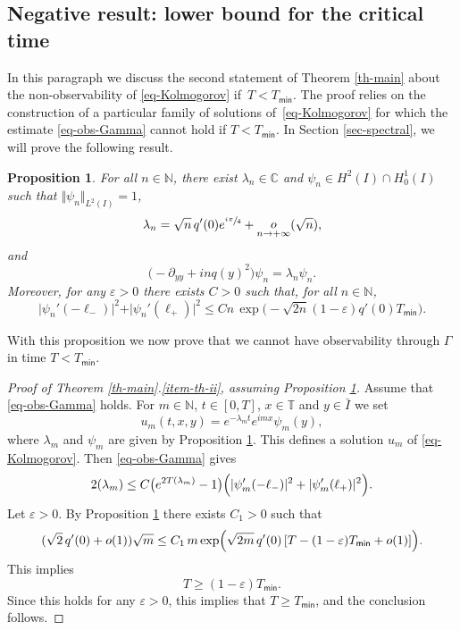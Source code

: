 \documentclass[JEP,XML,SOM,Unicode]{cedram}
\theoremstyle{plain}
\newtheorem{proposition}[theorem]{Proposition}
\theoremstyle{definition}
\newcommand{\abs}[1]{\vert #1\vert}
\newcommand{\littleo}[2]{\mathop{o}\limits_{#1 \to #2}}
\newcommand{\1}{\mathds 1}
\let\Re\relax
\DeclareMathOperator{\Re}{\mathsf{Re}\mkern2mu}
\def\C{\mathbb{C}}
\newcommand{\N}{\mathbb{N}}
\newcommand{\T}{\mathbb{T}}
\let\G\Gamma
\let\e\varepsilon
\let\l\lambda
\newcommand{\Tmin}{T_{\mathsf{min}}}
\begin{document}
\subsection{Negative result: lower bound for the critical time}

In this paragraph we discuss the second statement of Theorem \ref{th-main} about the non-observability of \eqref{eq-Kolmogorov} if~$T < \Tmin$. The proof relies on the construction of a particular family of solutions of~\eqref{eq-Kolmogorov} for which the estimate \eqref{eq-obs-Gamma} cannot hold if $T < \Tmin$. In Section \ref{sec-spectral}, we will prove the following result.

\begin {proposition}\label{prop-ln-psin}
For all $n \in \N$, there exist $\l_n \in \C$ and $\psi_n \in H^2(I) \cap H_0^1(I)$ such that $\Vert \psi_n \Vert_{L^2(I)} = 1$,
\begin{equation} \label{eq-lambda-n}
\l_n = \sqrt n\, q'(0) e^{\sfrac {i\pi}4} + \littleo{n}{+\infty}(\sqrt n),
\end{equation}
and
\[
\bigl(-\partial_{yy} + inq(y)^2 \bigr)\psi_n = \l_n \psi_n.
\]
Moreover, for any $\e > 0$ there exists $C > 0$ such that, for all $n \in \N$,
\begin{equation} \label{eq-Agmon-psi-n}
\vert \psi_n'(-\ell_-) \vert^2 + \vert \psi_n'(\ell_+) \vert^2 \leq
C n\, \exp\bigl(-\sqrt{2n}(1-\varepsilon) q'(0) \Tmin \bigr).
\end{equation}
\end{proposition}

With this proposition we now prove that we cannot have observability through $\G$ in time $T < \Tmin$.

\begin{proof}[Proof of Theorem \ref{th-main}.\eqref{item-th-ii}, assuming Proposition \ref{prop-ln-psin}]
Assume that \eqref{eq-obs-Gamma} holds. For $m \in \N$, $t \in [0,T]$, $x \in \T$ and $y \in \bar I$ we set
\[
u_m(t,x,y) = e^{-\lambda_m t} e^{i m x} \psi_m(y),
\]
where $\l_m$ and $\psi_m$ are given by Proposition \ref{prop-ln-psin}. This defines a solution $u_m$ of \eqref{eq-Kolmogorov}. Then \eqref{eq-obs-Gamma} gives
\[
2 \Re(\l_m) \leq C \bigl(e^{2T \Re(\l_m)}-1\bigr) \Bigl(\abs{\psi_m'(-\ell_-)}^2 + \abs{\psi_m'(\ell_+)}^2 \Bigr).
\]
Let $\varepsilon > 0$. By Proposition \ref{prop-ln-psin} there exists $C_1 > 0$ such that
\[
(\sqrt{2}\, q'(0) + o(1))\sqrt{m} \leq C_1 \, m \exp\Bigl(\sqrt{2m}\, q'(0) \left[ T - (1-\varepsilon) \Tmin + o(1) \right] \Bigr).
\]
This implies
\[
T \geq (1-\varepsilon) \Tmin.
\]
Since this holds for any $\e > 0$, this implies that $T \geq \Tmin$, and the conclusion follows.
\end{proof}
\end{document}
